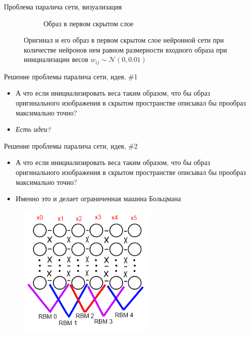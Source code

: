 \documentclass[10pt]{beamer}
\begin{document}
\begin{frame}{Проблема паралича сети, визуализация}
\begin{figure}
\begin{subfigure}[b]{0.5\textwidth}
                \caption{Образ в первом скрытом слое}                
        \end{subfigure}       
        \caption{Оригинал и его образ в первом скрытом слое нейронной сети при количестве нейронов нем равном размерности входного образа при инициализации весов $w_{ij} \sim \mathcal{N}\left(0, 0.01\right)$}
\end{figure}

\end{frame}


\begin{frame}{Решение проблемы паралича сети, идея, \#1}

\begin{itemize}
	\item А что если инициализировать веса таким образом, что бы образ оригинального изображения в скрытом пространстве описывал бы прообраз максимально точно?
	\item \textit{Есть идеи?}
\end{itemize}

\end{frame}


\begin{frame}{Решение проблемы паралича сети, идея, \#2}

\begin{itemize}
	\item А что если инициализировать веса таким образом, что бы образ оригинального изображения в скрытом пространстве описывал бы прообраз максимально точно?
	\item Именно это и делает ограниченная машина Больцмана
\end{itemize}

\begin{figure}[h!]
  \centering
  \includegraphics[width=0.6\textwidth]{images/rbm_pretrain.png}
\end{figure}

\end{frame}
\end{document}
